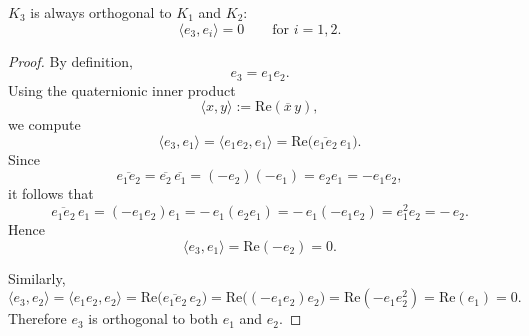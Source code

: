 \begin{proposition}
\label{prop:orthogonality-third-kernel}
$K_3$ is always orthogonal to $K_1$ and $K_2$:
\[
\langle e_3,e_i\rangle = 0 \qquad \text{for } i=1,2.
\]
\end{proposition}

\begin{proof}
By definition,
\[
e_3 = e_1 e_2.
\]
Using the quaternionic inner product
\[
\langle x,y\rangle := \mathrm{Re}(\overline{x}\,y),
\]
we compute
\[
\langle e_3,e_1\rangle
=
\langle e_1e_2,e_1\rangle
=
\mathrm{Re}\!\bigl(\overline{e_1e_2}\,e_1\bigr).
\]
Since
\[
\overline{e_1e_2}=\overline{e_2}\,\overline{e_1}=(-e_2)(-e_1)=e_2e_1=-e_1e_2,
\]
it follows that
\[
\overline{e_1e_2}\,e_1
=
(-e_1e_2)e_1
=
-\,e_1(e_2e_1)
=
-\,e_1(-e_1e_2)
=
e_1^2 e_2
=
-\,e_2.
\]
Hence
\[
\langle e_3,e_1\rangle
=
\mathrm{Re}(-e_2)=0.
\]

Similarly,
\[
\langle e_3,e_2\rangle
=
\langle e_1e_2,e_2\rangle
=
\mathrm{Re}\!\bigl(\overline{e_1e_2}\,e_2\bigr)
=
\mathrm{Re}\!\bigl((-e_1e_2)e_2\bigr)
=
\mathrm{Re}(-e_1 e_2^2)
=
\mathrm{Re}(e_1)=0.
\]
Therefore $e_3$ is orthogonal to both $e_1$ and $e_2$.
\end{proof}


